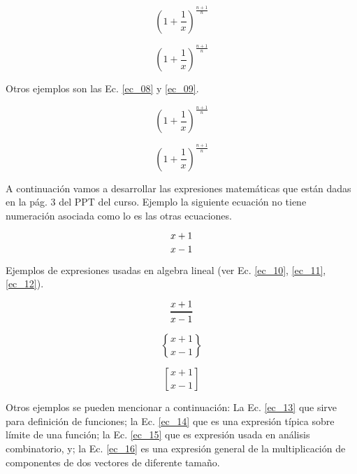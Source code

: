 \documentclass{article}
\begin{document}
\begin{equation} \label{ec_06}
    (1 + \frac{1}{x})^{\frac{n + 1}{n}}
\end{equation}

\begin{equation}  \label{ec_07}
    \left ( 1 + \frac{1}{x}  \right)^{\frac{n + 1}{n}}
\end{equation}

Otros ejemplos son las Ec. \eqref{ec_08} y \eqref{ec_09}.

\begin{equation}  \label{ec_08}
    \displaystyle {\left ( 1 + \frac{1}{x}  \right)^{\frac{n + 1}{n}}}
\end{equation}

\begin{equation}  \label{ec_09}
    \displaystyle {\left ( 1 + \frac{1}{x}  \right)} ^{{\displaystyle \frac{n + 1}{n}}}
\end{equation}

A continuación vamos a desarrollar las expresiones matemáticas que están dadas en la pág. 3 del PPT del curso. Ejemplo la siguiente ecuación no tiene numeración asociada como lo es las otras ecuaciones.

\begin{equation*} 
    {x + 1 \atop x - 1}    
\end{equation*}

Ejemplos de expresiones usadas en algebra lineal (ver Ec. \eqref{ec_10}, \eqref{ec_11}, \eqref{ec_12}).

\begin{equation} \label{ec_10}
    {x + 1 \above 1.2pt x - 1}
\end{equation}

\begin{equation} \label{ec_11}
    {x + 1 \brace x - 1}
\end{equation}

\begin{equation} \label{ec_12}
    {x + 1 \brack x - 1}
\end{equation}

Otros ejemplos se pueden mencionar a continuación: La Ec. \eqref{ec_13} que sirve para definición de funciones; la Ec. \eqref{ec_14} que es una expresión típica sobre límite de una función; la Ec. \eqref{ec_15} que es expresión usada en análisis combinatorio, y; la Ec. \eqref{ec_16} es una expresión general de la multiplicación de componentes de dos vectores de diferente tamaño.
\end{document}
